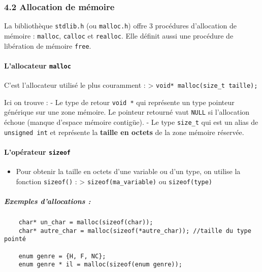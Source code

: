 \documentclass[11pt]{article}
\providecommand{\tightlist}{%
      \setlength{\itemsep}{0pt}\setlength{\parskip}{0pt}}
\begin{document}
    \subsubsection{4.2 Allocation de
mémoire}\label{allocation-de-muxe9moire}

La bibliothèque \texttt{stdlib.h} (ou \texttt{malloc.h}) offre 3
procédures d'allocation de mémoire : \texttt{malloc}, \texttt{calloc} et
\texttt{realloc}. Elle définit aussi une procédure de libération de
mémoire \texttt{free}.

\paragraph{\texorpdfstring{L'allocateur
\texttt{malloc}}{L'allocateur malloc}}\label{lallocateur-malloc}

C'est l'allocateur utilisé le plus couramment : \textgreater{}
\texttt{void*\ malloc(size\_t\ taille);}

Ici on trouve : - Le type de retour \texttt{void\ *} qui représente un
type pointeur générique sur une zone mémoire. Le pointeur retourné vaut
\texttt{NULL} si l'allocation échoue (manque d'espace mémoire contigüe).
- Le type \texttt{size\_t} qui est un alias de \texttt{unsigned\ int} et
représente la \textbf{taille en octets} de la zone mémoire réservée.

\paragraph{\texorpdfstring{L'opérateur
\texttt{sizeof}}{L'opérateur sizeof}}\label{lopuxe9rateur-sizeof}

\begin{itemize}
\tightlist
\item
  Pour obtenir la taille en octets d'une variable ou d'un type, on
  utilise la fonction \texttt{sizeof()} : \textgreater{}
  \texttt{sizeof(ma\_variable)} ou \texttt{sizeof(type)}
\end{itemize}

    \subparagraph{Exemples d'allocations :}\label{exemples-dallocations}

\begin{verbatim}
    char* un_char = malloc(sizeof(char));
    char* autre_char = malloc(sizeof(*autre_char)); //taille du type pointé
    
    enum genre = {H, F, NC};
    enum genre * il = malloc(sizeof(enum genre));
\end{verbatim}
\end{document}
